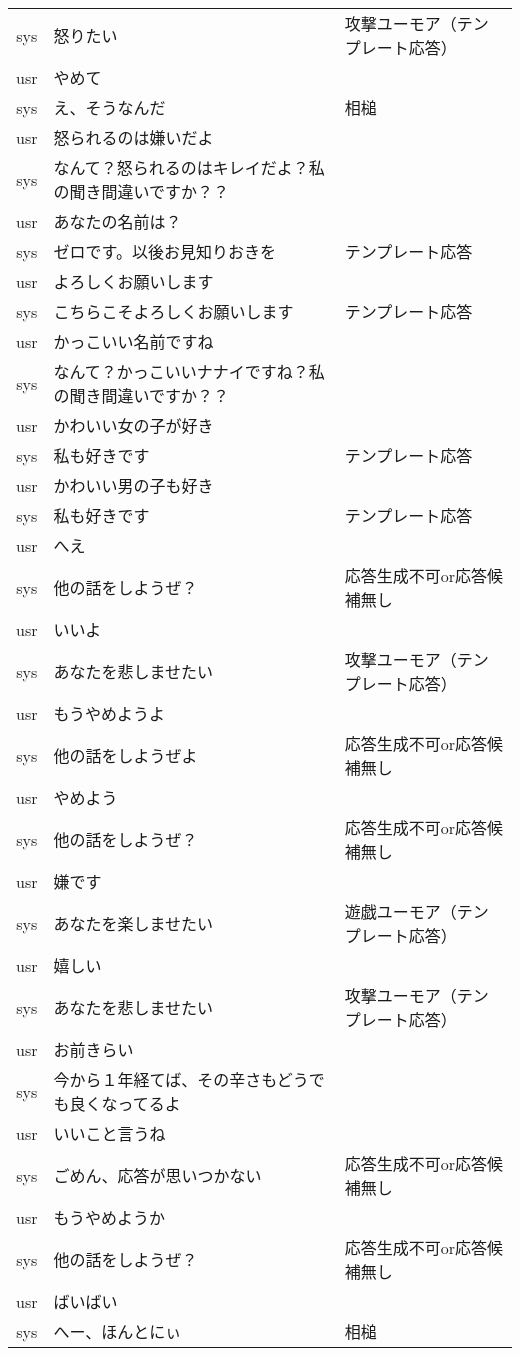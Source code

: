 \begin{longtable}{| c | p{} | p{}|}
sys & 怒りたい & 攻撃ユーモア（テンプレート応答）\\
usr & やめて & \\
sys & え、そうなんだ & 相槌\\
usr & 怒られるのは嫌いだよ & \\
sys & なんて？怒られるのはキレイだよ？私の聞き間違いですか？？ & \\
usr & あなたの名前は？ & \\
sys & ゼロです。以後お見知りおきを & テンプレート応答\\
usr & よろしくお願いします & \\
sys & こちらこそよろしくお願いします & テンプレート応答\\
usr & かっこいい名前ですね & \\
sys & なんて？かっこいいナナイですね？私の聞き間違いですか？？ & \\
usr & かわいい女の子が好き & \\
sys & 私も好きです & テンプレート応答\\
usr & かわいい男の子も好き & \\
sys & 私も好きです & テンプレート応答\\
usr & へえ & \\
sys & 他の話をしようぜ？ & 応答生成不可or応答候補無し\\
usr & いいよ & \\
sys & あなたを悲しませたい & 攻撃ユーモア（テンプレート応答）\\
usr & もうやめようよ & \\
sys & 他の話をしようぜよ & 応答生成不可or応答候補無し\\
usr & やめよう & \\
sys & 他の話をしようぜ？ & 応答生成不可or応答候補無し\\
usr & 嫌です & \\
sys & あなたを楽しませたい & 遊戯ユーモア（テンプレート応答）\\
usr & 嬉しい & \\
sys & あなたを悲しませたい & 攻撃ユーモア（テンプレート応答）\\
usr & お前きらい & \\
sys & 今から１年経てば、その辛さもどうでも良くなってるよ & \\
usr & いいこと言うね & \\
sys & ごめん、応答が思いつかない & 応答生成不可or応答候補無し\\
usr & もうやめようか & \\
sys & 他の話をしようぜ？ & 応答生成不可or応答候補無し\\
usr & ばいばい & \\
sys & へー、ほんとにぃ & 相槌\\
\hline
\end{longtable}


